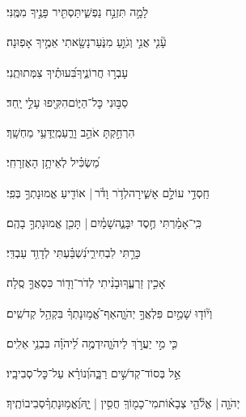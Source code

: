 \documentclass[12pt]{article}
\newcommand{\loc}[1]{\textsuperscript{\locf{#1}}}
\begin{document}
{\loc{ טו}~}‏לָמָ֣ה  תִּזְנַ֣ח נַפְשִׁ֑י{\hfill}תַּסְתִּ֖יר פָּנֶ֣יךָ מִמֶּֽנִּי׃\par

{\loc{ טז}~}‏עָ֘נִ֤י אֲנִ֣י וְגֹוֵ֣עַ מִנֹּ֑עַר{\hfill}נָשָׂ֖אתִי אֵמֶ֣יךָ אָפֽוּנָה׃\par

{\loc{ יז}~}‏ עָבְר֣וּ חֲרוֹנֶ֑יךָ{\hfill}בִּ֝עוּתֶ֗יךָ צִמְּתוּתֻֽנִי׃\par

{\loc{ יח}~}‏סַבּ֣וּנִי  כׇּל־הַיּ֑וֹם{\hfill}הִקִּ֖יפוּ עָלַ֣י יָֽחַד׃\par

{\loc{ יט}~}‏הִרְחַ֣קְתָּ  אֹהֵ֣ב וָרֵ֑עַ{\hfill}מְֽיֻדָּעַ֥י מַחְשָֽׁךְ׃\par\pend
\ledpb
\pstart[\subsection*{\textcolor{red}{פרק פט}}]\label{פרק פט}
{\loc{ א}~}‏מַ֝שְׂכִּ֗יל לְאֵיתָ֥ן הָאֶזְרָחִֽי׃\par

{\loc{ ב}~}‏חַֽסְדֵ֣י  עוֹלָ֣ם אָשִׁ֑ירָה{\hfill}לְדֹ֥ר וָדֹ֓ר |  אוֹדִ֖יעַ אֱמוּנָתְךָ֣ בְּפִֽי׃\par

{\loc{ ג}~}‏כִּֽי־אָמַ֗רְתִּי  חֶ֣סֶד יִבָּנֶ֑ה{\hfill}שָׁמַ֓יִם |  תָּכִ֖ן אֱמוּנָתְךָ֣ בָהֶֽם׃\par

{\loc{ ד}~}‏כָּרַ֣תִּי  לִבְחִירִ֑י{\hfill}נִ֝שְׁבַּ֗עְתִּי לְדָוִ֥ד עַבְדִּֽי׃\par

{\loc{ ה}~}‏ אָכִ֣ין זַרְעֶ֑ךָ{\hfill}וּבָנִ֨יתִי לְדֹר־וָד֖וֹר כִּסְאֲךָ֣ סֶֽלָה׃\par

{\loc{ ו}~}‏וְי֘וֹד֤וּ שָׁמַ֣יִם פִּלְאֲךָ֣ יְהֹוָ֑ה{\hfill}אַף־אֱ֝מ֥וּנָתְךָ֗ בִּקְהַ֥ל קְדֹשִֽׁים׃\par

{\loc{ ז}~}‏כִּ֤י מִ֣י  יַעֲרֹ֣ךְ לַיהֹוָ֑ה{\hfill}יִדְמֶ֥ה לַ֝יהֹוָ֗ה בִּבְנֵ֥י אֵלִֽים׃\par

{\loc{ ח}~}‏אֵ֣ל  בְּסוֹד־קְדֹשִׁ֣ים רַבָּ֑ה{\hfill}וְ֝נוֹרָ֗א עַל־כׇּל־סְבִיבָֽיו׃\par

{\loc{ ט}~}‏יְהֹוָ֤ה |  אֱלֹ֘הֵ֤י צְבָא֗וֹת{\hfill}מִי־כָמ֖וֹךָֽ חֲסִ֥ין | יָ֑הּ\newline\hspace*{.5em}וֶ֝אֱמ֥וּנָתְךָ֗{\hfill}סְבִיבוֹתֶֽיךָ׃\par
\end{document}
